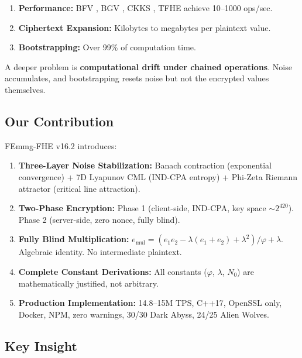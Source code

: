 \documentclass{article}
\begin{document}
\begin{enumerate}
    \item \textbf{Performance:} BFV \cite{fan2012}, BGV \cite{brakerski2014}, CKKS \cite{cheon2017}, TFHE \cite{chillotti2020} achieve 10--1000 ops/sec.
    \item \textbf{Ciphertext Expansion:} Kilobytes to megabytes per plaintext value.
    \item \textbf{Bootstrapping:} Over 99\% of computation time.
\end{enumerate}

A deeper problem is \textbf{computational drift under chained operations}. Noise accumulates, and bootstrapping resets noise but not the encrypted values themselves.

\subsection{Our Contribution}

FEmmg-FHE v16.2 introduces:

\begin{enumerate}
    \item \textbf{Three-Layer Noise Stabilization:} Banach contraction (exponential convergence) + 7D Lyapunov CML (IND-CPA entropy) + Phi-Zeta Riemann attractor (critical line attraction).
    
    \item \textbf{Two-Phase Encryption:} Phase 1 (client-side, IND-CPA, key space $\sim 2^{420}$). Phase 2 (server-side, zero nonce, fully blind).
    
    \item \textbf{Fully Blind Multiplication:} $e_{\text{mul}} = (e_1 e_2 - \lambda(e_1 + e_2) + \lambda^2)/\varphi + \lambda$. Algebraic identity. No intermediate plaintext.
    
    \item \textbf{Complete Constant Derivations:} All constants ($\varphi$, $\lambda$, $N_0$) are mathematically justified, not arbitrary.
    
    \item \textbf{Production Implementation:} 14.8--15M TPS, C++17, OpenSSL only, Docker, NPM, zero warnings, 30/30 Dark Abyss, 24/25 Alien Wolves.
\end{enumerate}

\subsection{Key Insight}
\end{document}
